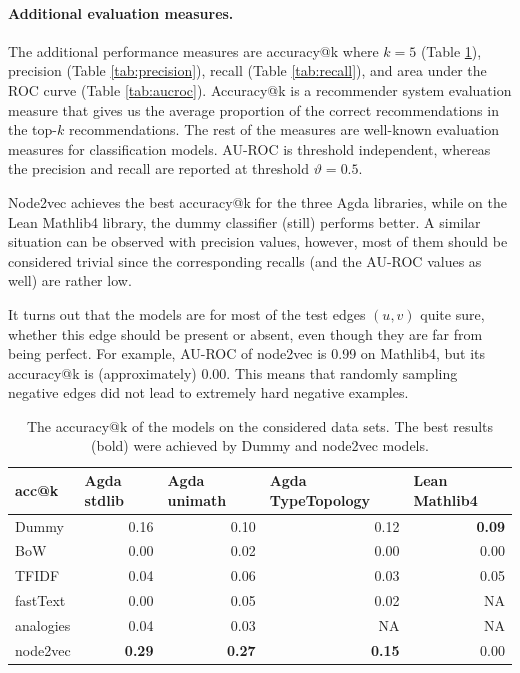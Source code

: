 \documentclass{article}
\begin{document}
\paragraph{Additional evaluation measures.} The additional performance measures are
accuracy@k where $k = 5$ (Table \ref{tab:acc-k}), precision (Table \ref{tab:precision}), recall (Table \ref{tab:recall}), and area under the ROC curve (Table \ref{tab:aucroc}). Accuracy@k is a recommender system evaluation measure that gives us the average proportion of the correct recommendations in the top-$k$ recommendations. The rest of the measures are well-known evaluation measures for classification models. AU-ROC is threshold independent, whereas the precision and recall are reported at threshold $\vartheta = 0.5$.

Node2vec achieves the best accuracy@k for the three Agda libraries, while on the Lean Mathlib4 library, the dummy classifier (still) performs better.
A similar situation can be observed with precision values, however, most of them should be considered trivial since the corresponding recalls (and the AU-ROC values as well) are rather low.

It turns out that the models are for most of the test edges $(u, v)$ quite sure, whether this edge should be present or absent, even though they are far from being perfect. For example, AU-ROC of node2vec is 0.99 on Mathlib4, but its accuracy@k is (approximately) 0.00. This means that randomly sampling negative edges did not lead to extremely hard negative examples.

\begin{table}[htb!]
  \centering
   \caption{The accuracy@k of the models on the considered data sets. The best results (bold) were achieved by Dummy and node2vec models.}
    \begin{tabular}{l|rrrr}
    acc@k & \multicolumn{1}{l}{Agda stdlib} & \multicolumn{1}{l}{Agda unimath} & \multicolumn{1}{l}{Agda TypeTopology} & \multicolumn{1}{l}{Lean Mathlib4} \\
    \midrule
    Dummy & 0.16  & 0.10  & 0.12  & \textbf{0.09 }\\
    BoW   & 0.00  & 0.02  & 0.00  & 0.00 \\
    TFIDF & 0.04  & 0.06  & 0.03  & 0.05 \\
    fastText & 0.00  & 0.05  & 0.02  & \multicolumn{1}{r}{NA} \\
    analogies & 0.04  & 0.03  & \multicolumn{1}{r}{NA} & \multicolumn{1}{r}{NA} \\
    node2vec & \textbf{0.29}  &\textbf{ 0.27}  & \textbf{0.15}  & 0.00 \\
    \end{tabular}%
  \label{tab:acc-k}%
\end{table}%
\end{document}
